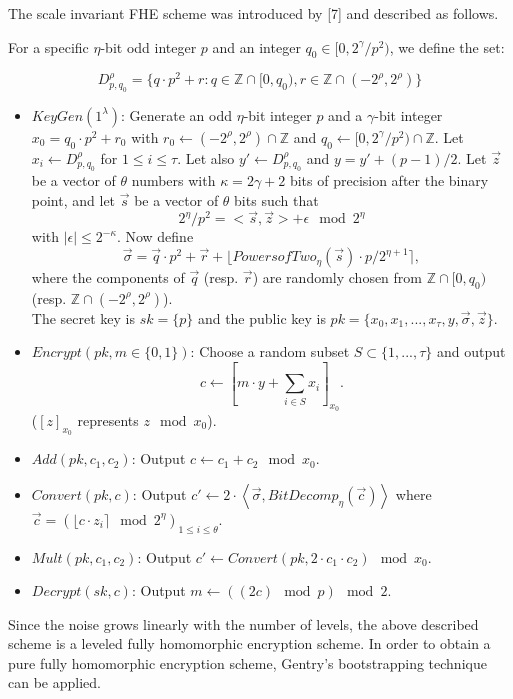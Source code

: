 \documentclass[../../main.tex]{subfiles}
\begin{document}
\noindent The scale invariant FHE scheme was introduced by [7] and described as follows. \\

\begin{addmargin}[1em]{2em}%
For a specific $\eta$-bit odd integer $p$ and an integer $q_0 \in [0,2^\gamma/p^2)$, we define the set:

\begin{equation*}
    D^\rho_{p,q_0} = \{q \cdot p^2 + r : q \in \mathbb{Z} \cap [0,q_0), r \in \mathbb{Z} \cap (-2^\rho, 2^\rho)\}
\end{equation*}

\begin{itemize}
    \item $KeyGen(1^\lambda)$: Generate an odd $\eta$-bit integer $p$ and a $\gamma$-bit integer $x_0=q_0 \cdot p^2 + r_0$ with $r_0 \leftarrow (-2^\rho, 2^\rho) \cap \mathbb{Z}$ and $q_0 \leftarrow [0, 2^\gamma / p^2) \cap \mathbb{Z}$. Let $x_i \leftarrow D^\rho_{p,{q_0}}$ for $1 \leq i \leq \tau$. Let also $y' \leftarrow D^\rho_{p,{q_0}}$ and $y = y' + (p-1)/2.$
    Let $\vec z$ be a vector of $\theta$ numbers with $\kappa = 2\gamma + 2$ bits of precision after the binary point, and let $\vec s$ be a vector of $\theta$ bits such that
    \begin{equation*}
        2^\eta / p^2 = <\vec s, \vec z> + \epsilon \mod 2^\eta
    \end{equation*}
    with $|\epsilon| \leq 2^{-\kappa}$. Now define
    \begin{equation*}
        \vec \sigma = \vec q \cdot p^2 + \vec r + \lfloor PowersofTwo_\eta(\vec s) \cdot p/2^{\eta + 1} \rceil,
    \end{equation*}
    where the components of $\vec q$ (resp. $\vec r$) are randomly chosen from $\mathbb{Z} \cap [0,q_0)$ (resp. $\mathbb{Z } \cap (-2^\rho, 2^\rho)$). \\
    The secret key is $sk = \{p\}$ and the public key is $pk = \{x_0,x_1,...,x_\tau, y, \vec \sigma, \vec z\}$.
    \item $Encrypt(pk, m \in \{0,1\})$: Choose a random subset $S \subset \{1,...,\tau\}$ and output 
    \begin{equation*}
        c \leftarrow \left[m \cdot y + \sum_{i \in S}{x_i}\right]_{x_0}.
    \end{equation*}
    ($[z]_{x_0}$ represents $z \mod x_0$).
    \item $Add(pk,c_1,c_2)$: Output $c \leftarrow c_1 + c_2 \mod x_0$.
    \item $Convert(pk,c)$: Output $c' \leftarrow 2 \cdot \left< \vec \sigma, BitDecomp_\eta(\vec c) \right>$ where $\vec c = \left(\lfloor c \cdot z_i \rceil \mod 2^\eta \right)_{1 \leq i \leq \theta} $.
    \item $Mult(pk,c_1,c_2)$: Output $c' \leftarrow Convert(pk,2 \cdot c_1 \cdot c_2) \mod x_0$.
    \item $Decrypt(sk,c)$: Output $m \leftarrow ((2c) \mod p) \mod 2$.
\end{itemize}
\end{addmargin}

\noindent Since the noise grows linearly with the number of levels, the above described scheme is a leveled fully homomorphic encryption scheme. In order to obtain a pure fully homomorphic encryption scheme, Gentry's bootstrapping technique can be applied.
\end{document}
